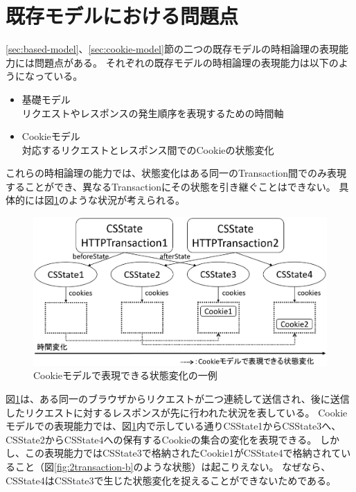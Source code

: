 \documentclass[12pt,a4paper]{jbook}
\begin{document}
\section{既存モデルにおける問題点}
\label{sec:existing-models-problems}
\color{red}
\ref{sec:based-model}、\ref{sec:cookie-model}節の二つの既存モデルの時相論理の表現能力には問題点がある。
それぞれの既存モデルの時相論理の表現能力は以下のようになっている。
\begin{itemize}
\item 基礎モデル \\
リクエストやレスポンスの発生順序を表現するための時間軸
\item Cookieモデル \\
対応するリクエストとレスポンス間でのCookieの状態変化
\end{itemize}
これらの時相論理の能力では、状態変化はある同一のTransaction間でのみ表現することができ、異なるTransactionにその状態を引き継ぐことはできない。
具体的には図\ref{fig:2transaction-a}のような状況が考えられる。
\begin{figure}[htb]
\centering
\includegraphics[width=450pt]{./fig/2transaction-a.eps}
\caption{Cookieモデルで表現できる状態変化の一例}
\label{fig:2transaction-a}
\end{figure}
図\ref{fig:2transaction-a}は、ある同一のブラウザからリクエストが二つ連続して送信され、後に送信したリクエストに対するレスポンスが先に行われた状況を表している。
Cookieモデルでの表現能力では、図\ref{fig:2transaction-a}内で示している通りCSState1からCSState3へ、CSState2からCSState4への保有するCookieの集合の変化を表現できる。
しかし、この表現能力ではCSState3で格納されたCookie1がCSState4で格納されていること（図\ref{fig:2transaction-b}のような状態）は起こりえない。
なぜなら、CSState4はCSState3で生じた状態変化を捉えることができないためである。
\end{document}
